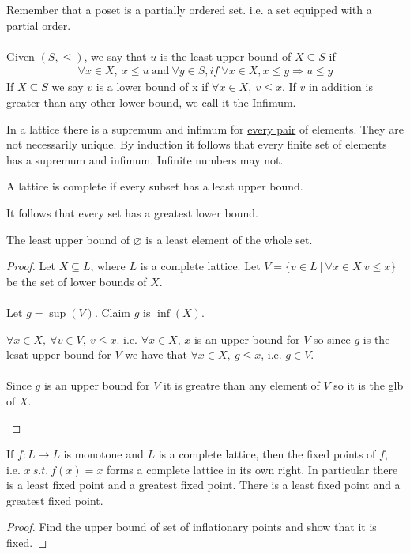 \documentclass[../598comp.tex]{subfiles}
\begin{document}
Remember that a poset is a partially ordered set. i.e. a set equipped with a
partial order.
\\\\
Given $(S, \leq)$, we say that $u$ is \ul{the least upper bound} of $X \subseteq
S$ if 
\begin{gather*}
  \forall x \in X, \ x \leq u \ \text{and} \ \forall y \in S, if \ \forall x \in X, x
  \leq y \Rightarrow u \leq y
\end{gather*}
If $X \subseteq S$ we say $v$ is a lower bound of x if $\forall x \in X, \ v
\leq x$. If $v$ in addition is greater than any other lower bound, we call it
the Infimum.
\begin{definition}
  In a lattice there is a supremum and infimum for \ul{every pair} of elements.
  They are not necessarily unique. By induction it follows that every finite set
  of elements has a supremum and infimum. Infinite numbers may not.
\end{definition}
\begin{definition}
  A lattice is complete if every subset has a least upper bound.
  \begin{fact}
    It follows that every set has a greatest lower bound.
  \end{fact}
\end{definition}
The least upper bound of $\varnothing$ is a least element of the whole set.
\begin{proof}
  Let $X \subseteq L$, where $L$ is a complete lattice. Let $V = \{v \in L \ | \
  \forall x \in X \ v \leq x\}$ be the set of lower bounds of $X$.
  \\\\
  Let $g = \sup(V)$. Claim $g$ is $\inf(X)$.
  \begin{note}
    $\forall x \in X, \ \forall v \in V, \ v \leq x$. i.e. $\forall x \in X$,
    $x$ is an upper bound for $V$ so since $g$ is the lesat upper bound for $V$
    we have that $\forall x \in X, \ g \leq x$, i.e. $g \in V$.
    \\\\
    Since $g$ is an upper bound for $V$ it is greatre than any element of $V$ so
    it is the glb of $X$.
  \end{note}
\end{proof}
\begin{theorem}
  If $f: L \to L$ is monotone and $L$ is a complete lattice, then the fixed
  points of $f$, i.e. $x \ s.t.\ f(x) = x$ forms a complete lattice in its own
  right. In particular there is a least fixed point and a greatest fixed point.
  There is a least fixed point and a greatest fixed point.
  \begin{proof}
    Find the upper bound of set of inflationary points and show that it is fixed.
  \end{proof}
\end{theorem}
\end{document}
